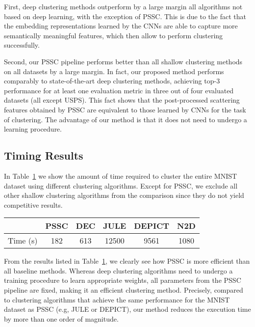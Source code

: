 \documentclass[11pt]{article}
\theoremstyle{definition}
\newcommand{\Table}[1]{Table~\ref{#1}}
\begin{document}
First, deep clustering methods outperform by a large margin all algorithms not based on deep learning, with the exception of PSSC. This is due to the fact that the embedding representations learned by the CNNs are able to capture more semantically meaningful features, which then allow to perform clustering successfully.

Second, our PSSC pipeline performs better than all shallow clustering methods on all datasets by a large margin. In fact, our proposed method performs comparably to state-of-the-art deep clustering methods, achieving top-3 performance for at least one evaluation metric in three out of four evaluated datasets (all except USPS).
This fact shows that the post-processed scattering features obtained by PSSC are equivalent to those learned by CNNs for the task of clustering. The advantage of our method is that it does not need to undergo a learning procedure.



\subsection{Timing Results}

In \Table{table:time comparison} we show the amount of time required to cluster the entire MNIST dataset using different clustering algorithms. Except for PSSC, we exclude all other shallow clustering algorithms from the comparison since they do not yield competitive results.

\begin{table}[h]
	\centering
	\label{table:time comparison}
\begin{tabular}{|l|ccccc|}
		\hline
		& PSSC & DEC & JULE & DEPICT & N2D \\
		\hline
		Time (s) & 182  & 613 & 12500 & 9561 & 1080 \\
		\hline
	\end{tabular}
\end{table}

From the results listed in \Table{table:time comparison}, we clearly see how PSSC is more efficient than all baseline methods. 
Whereas deep clustering algorithms need to undergo a training procedure to learn appropriate weights, all parameters from the PSSC pipeline are fixed, making it an efficient clustering method. Precisely, compared to clustering algorithms that achieve the same performance for the MNIST dataset as PSSC (e.g, JULE or DEPICT), our method reduces the execution time by more than one order of magnitude.
\end{document}
